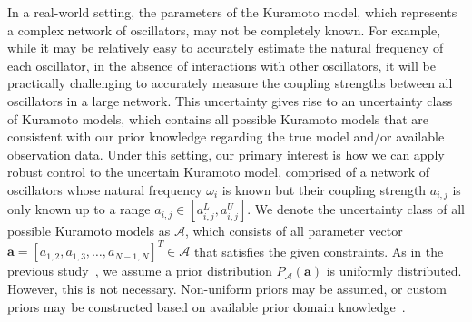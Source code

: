 \documentclass{article}
\begin{document}
In a real-world setting, the parameters of the Kuramoto model, which represents a complex network of oscillators, may not be completely known. For example, while it may be relatively easy to accurately estimate the natural frequency of each oscillator, in the absence of interactions with other oscillators, it will be practically challenging to accurately measure the coupling strengths between all oscillators in a large network. This uncertainty gives rise to an uncertainty class of Kuramoto models, which contains all possible Kuramoto models that are consistent with our prior knowledge regarding the true model and/or available observation data. Under this setting, our primary interest is how we can apply robust control to the uncertain Kuramoto model, comprised of a network of oscillators whose natural frequency ${\omega_{i}}$ is known but their coupling strength ${a_{i, j}}$ is only known up to a range ${a_{i, j}} \in {\left[a_{i, j}^{L}, a_{i, j}^{U}\right]}$. We denote the uncertainty class of all possible Kuramoto models as ${\mathbf{\mathcal{A}}}$, which consists of all parameter vector ${\mathbf{a} = [a_{1, 2}, a_{1, 3}, \dots, a_{N-1, N}]^T} \in {\mathbf{\mathcal{A}}}$ that satisfies the given constraints. As in the previous study~\cite{Hong2021}, we assume a prior distribution ${P_{\mathbf{\mathcal{A}}} \left( \mathbf{a} \right)}$ is uniformly distributed. However, this is not necessary. Non-uniform priors may be assumed, or custom priors may be constructed based on available prior domain knowledge~\cite{Boluki2017bmc,Boluki2017tcbb}.
\end{document}
